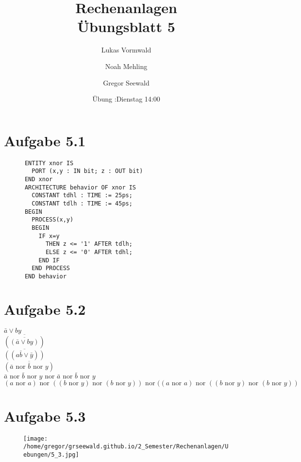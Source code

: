 \documentclass[11pt,a4paper]{article}
\title{Rechenanlagen\\Übungsblatt 5}
\author{Lukas Vormwald \and Noah Mehling \and Gregor Seewald}
\date{Übung :Dienstag 14:00}
\newcommand{\nor}[0]{\ensuremath{\text{ nor }}}
\begin{document}
\maketitle
  \section*{Aufgabe 5.1}
    \begin{verbatim}
      ENTITY xnor IS
        PORT (x,y : IN bit; z : OUT bit)
      END xnor
      ARCHITECTURE behavior OF xnor IS
        CONSTANT tdhl : TIME := 25ps;
        CONSTANT tdlh : TIME := 45ps;
      BEGIN
        PROCESS(x,y)
        BEGIN
          IF x=y
            THEN z <= '1' AFTER tdlh;
            ELSE z <= '0' AFTER tdhl;
          END IF
        END PROCESS
      END behavior
    \end{verbatim}

  \section*{Aufgabe 5.2}
    $\bar a \vee by$\\
    $\overline{(\overline{(\bar a \vee by)})}$\\
    $\overline{((a \bar b \vee \bar y))}$\\
    $\overline{(\bar a \nor \bar b \nor y)}$\\
    $\bar a \nor \bar b \nor y \nor \bar a \nor \bar b \nor y$\\
    $(a \nor a) \nor ((b \nor y) \nor (b \nor y)) \nor ((a \nor a) \nor ((b \nor y) \nor (b \nor y))$

\newpage

  \section*{Aufgabe 5.3}

  \begin{figure}[ht!]
    \centering
    \texttt{[image: /home/gregor/grseewald.github.io/2\_Semester/Rechenanlagen/Uebungen/5\_3.jpg]}
  \end{figure}
\end{document}
